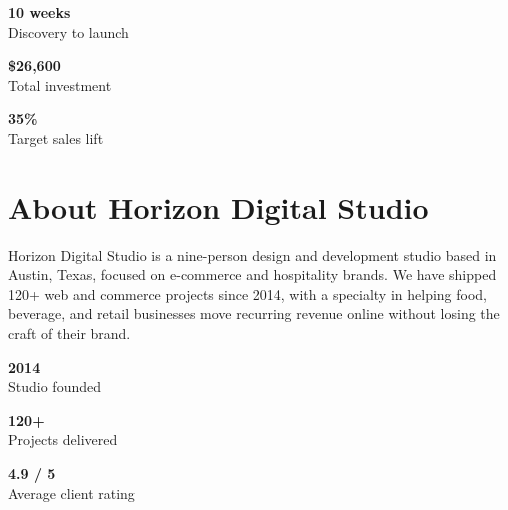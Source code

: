 \documentclass[11pt]{article}
\begin{document}
\vspace{0.6em}
\noindent
\begin{minipage}[t]{0.315\linewidth}
  \begin{tcolorbox}[statbox]
    \centering
    {\Large\bfseries\color{accent}10 weeks}\\
    {\small\color{softgray}Discovery to launch}
  \end{tcolorbox}
\end{minipage}\hfill
\begin{minipage}[t]{0.315\linewidth}
  \begin{tcolorbox}[statbox]
    \centering
    {\Large\bfseries\color{accent}\$26,600}\\
    {\small\color{softgray}Total investment}
  \end{tcolorbox}
\end{minipage}\hfill
\begin{minipage}[t]{0.315\linewidth}
  \begin{tcolorbox}[statbox]
    \centering
    {\Large\bfseries\color{accent}35\%}\\
    {\small\color{softgray}Target sales lift}
  \end{tcolorbox}
\end{minipage}

\section{About Horizon Digital Studio}

Horizon Digital Studio is a nine-person design and development studio based in Austin, Texas,
focused on e-commerce and hospitality brands. We have shipped 120+ web and commerce projects
since 2014, with a specialty in helping food, beverage, and retail businesses move recurring
revenue online without losing the craft of their brand.

\vspace{0.4em}
\noindent
\begin{minipage}[t]{0.315\linewidth}
  \begin{tcolorbox}[statbox]
    \centering
    {\Large\bfseries\color{accent2}2014}\\
    {\small\color{softgray}Studio founded}
  \end{tcolorbox}
\end{minipage}\hfill
\begin{minipage}[t]{0.315\linewidth}
  \begin{tcolorbox}[statbox]
    \centering
    {\Large\bfseries\color{accent2}120+}\\
    {\small\color{softgray}Projects delivered}
  \end{tcolorbox}
\end{minipage}\hfill
\begin{minipage}[t]{0.315\linewidth}
  \begin{tcolorbox}[statbox]
    \centering
    {\Large\bfseries\color{accent2}4.9 / 5}\\
    {\small\color{softgray}Average client rating}
  \end{tcolorbox}
\end{minipage}
\end{document}
